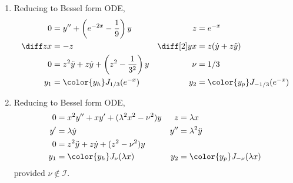 \begin{enumerate}
    \item Reducing to Bessel form ODE,
          \begin{align}
              0                      & = y'' + \left( e^{-2x} - \frac{1}{9}
              \right) y              &
              z                      & = e^{-x}                                   \\
              \diff zx               & = -z                                     &
              \diff[2] yx            & = z (\dot{y} + z\ddot{y})                  \\
              0                      & = z^2 \ddot{y} + z\dot{y} + \left( z^2 -
              \frac{1}{3^2} \right)y &
              \nu                    & = 1/3                                      \\
              y_1                    & = \color{y_h} J_{1/3}(e^{-x})            &
              y_2                    & = \color{y_p} J_{-1/3}(e^{-x})
          \end{align}

    \item Reducing to Bessel form ODE,
          \begin{align}
              0   & = x^2y'' + xy' + (\lambda^2x^2 - \nu^2) y  &
              z   & = \lambda x                                  \\
              y'  & = \lambda \dot{y}                          &
              y'' & = \lambda^2 \ddot{y}                         \\
              0   & = z^2 \ddot{y} + z\dot{y} + (z^2 - \nu^2)y   \\
              y_1 & = \color{y_h} J_{\nu}(\lambda x)           &
              y_2 & = \color{y_p} J_{-\nu}(\lambda x)
          \end{align}
          provided $ \nu \not\in \mathcal{I}$.


\end{enumerate}
